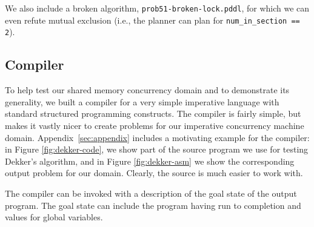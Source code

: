 We also include a broken algorithm, \texttt{prob51-broken-lock.pddl}, for which we can even refute mutual exclusion (i.e., the planner can plan for \texttt{num\_in\_section == 2}).

\subsection{Compiler}

To help test our shared memory concurrency domain and to demonstrate
its generality, we built a compiler for a very simple imperative
language with standard structured programming constructs. The compiler
is fairly simple, but makes it vastly nicer to create problems for our
imperative concurrency machine domain.
Appendix~\ref{sec:appendix} includes a motivating example for the compiler:
in Figure
\ref{fig:dekker-code}, we show part of the source program we use for
testing Dekker's algorithm, and in Figure \ref{fig:dekker-asm} we show the
corresponding output problem for our domain. Clearly, the source is
much easier to work with.

The compiler can be invoked with a description of the goal state of
the output program. The goal state can include the program having run
to completion and values for global variables.
